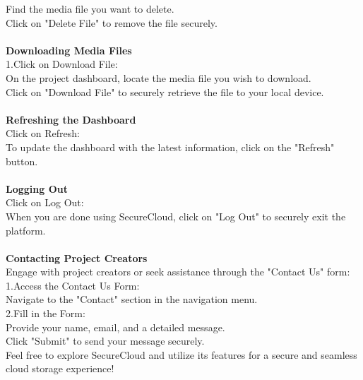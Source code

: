 Find the media file you want to delete.\\
Click on "Delete File" to remove the file securely. 
\\
\\
\textbf{Downloading Media Files }\\
1.Click on Download File:\\
On the project dashboard, locate the media file you wish to download.\\
Click on "Download File" to securely retrieve the file to your local device. 
\\
\\
\textbf{Refreshing the Dashboard}\\
Click on Refresh:\\
To update the dashboard with the latest information, click on the "Refresh" button. 
\\
\\
\textbf{Logging Out}\\
Click on Log Out:\\
When you are done using SecureCloud, click on "Log Out" to securely exit the platform. 
\\
\\
\textbf{Contacting Project Creators }\\
Engage with project creators or seek assistance through the "Contact Us" form:\\
1.Access the Contact Us Form:\\
Navigate to the "Contact" section in the navigation menu.\\
2.Fill in the Form:\\
Provide your name, email, and a detailed message.\\
Click "Submit" to send your message securely.\\
Feel free to explore SecureCloud and utilize its features for a secure and seamless cloud storage
experience! 
\\
\\


